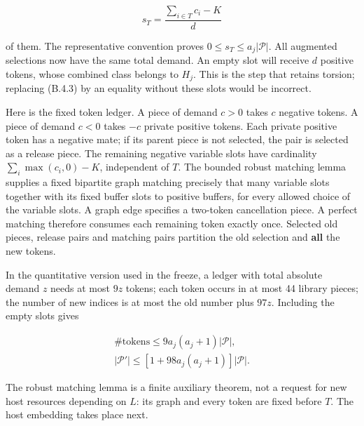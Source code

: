 \documentclass[english,11pt,a4paper]{article}
\begin{document}
\[s_T=\frac{\sum_{i\in T}c_i-K}{d}\]

of them. The representative convention proves \(0\le s_T\le a_j|\mathcal P|\). All augmented selections now have the same total demand. An empty slot will receive \(d\) positive tokens, whose combined class belongs to \(H_j\). This is the step that retains torsion; replacing (B.4.3) by an equality without these slots would be incorrect.

Here is the fixed token ledger. A piece of demand \(c>0\) takes \(c\) negative tokens. A piece of demand \(c<0\) takes \(-c\) private positive tokens. Each private positive token has a negative mate; if its parent piece is not selected, the pair is selected as a release piece. The remaining negative variable slots have cardinality \(\sum_i\max(c_i,0)-K\), independent of \(T\). The bounded robust matching lemma supplies a fixed bipartite graph matching precisely that many variable slots together with its fixed buffer slots to positive buffers, for every allowed choice of the variable slots. A graph edge specifies a two-token cancellation piece. A perfect matching therefore consumes each remaining token exactly once. Selected old pieces, release pairs and matching pairs partition the old selection and \textbf{all} the new tokens.

In the quantitative version used in the freeze, a ledger with total absolute demand \(z\) needs at most \(9z\) tokens; each token occurs in at most 44 library pieces; the number of new indices is at most the old number plus \(97z\). Including the empty slots gives

\[\begin{gathered}
\#\text{tokens}\le9a_j(a_j+1)|\mathcal P|,\\
|\mathcal P'|\le[1+98a_j(a_j+1)]|\mathcal P|.
\end{gathered}
\tag{B.4.4}\]

The robust matching lemma is a finite auxiliary theorem, not a request for new host resources depending on \(L\): its graph and every token are fixed before \(T\). The host embedding takes place next.
\end{document}
